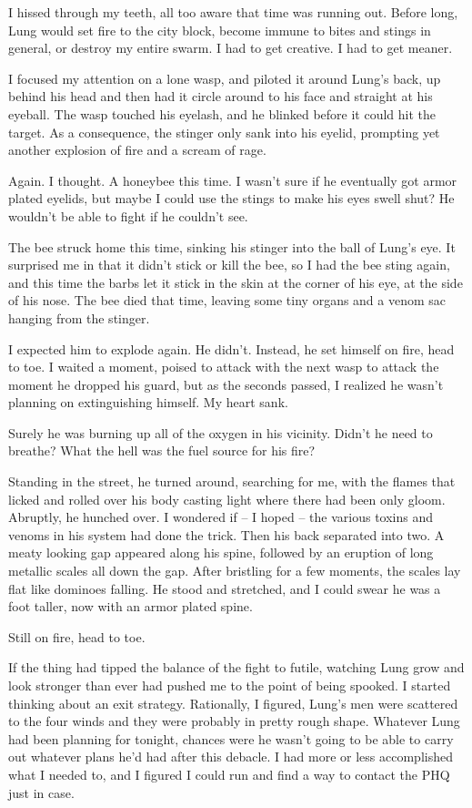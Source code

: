 I hissed through my teeth, all too aware that time was running out. Before long, Lung would set fire to the city block, become immune to bites and stings in general, or destroy my entire swarm. I had to get creative. I had to get meaner.

I focused my attention on a lone wasp, and piloted it around Lung's back, up behind his head and then had it circle around to his face and straight at his eyeball. The wasp touched his eyelash, and he blinked before it could hit the target. As a consequence, the stinger only sank into his eyelid, prompting yet another explosion of fire and a scream of rage.

Again. I thought. A honeybee this time. I wasn't sure if he eventually got armor plated eyelids, but maybe I could use the stings to make his eyes swell shut? He wouldn't be able to fight if he couldn't see.

The bee struck home this time, sinking his stinger into the ball of Lung's eye. It surprised me in that it didn't stick or kill the bee, so I had the bee sting again, and this time the barbs let it stick in the skin at the corner of his eye, at the side of his nose. The bee died that time, leaving some tiny organs and a venom sac hanging from the stinger.

I expected him to explode again. He didn't. Instead, he set himself on fire, head to toe. I waited a moment, poised to attack with the next wasp to attack the moment he dropped his guard, but as the seconds passed, I realized he wasn't planning on extinguishing himself. My heart sank.

Surely he was burning up all of the oxygen in his vicinity. Didn't he need to breathe? What the hell was the fuel source for his fire?

Standing in the street, he turned around, searching for me, with the flames that licked and rolled over his body casting light where there had been only gloom. Abruptly, he hunched over. I wondered if -- I hoped -- the various toxins and venoms in his system had done the trick. Then his back separated into two. A meaty looking gap appeared along his spine, followed by an eruption of long metallic scales all down the gap. After bristling for a few moments, the scales lay flat like dominoes falling. He stood and stretched, and I could swear he was a foot taller, now with an armor plated spine.

Still on fire, head to toe.

If the  thing had tipped the balance of the fight to futile, watching Lung grow and look stronger than ever had pushed me to the point of being spooked. I started thinking about an exit strategy. Rationally, I figured, Lung's men were scattered to the four winds and they were probably in pretty rough shape. Whatever Lung had been planning for tonight, chances were he wasn't going to be able to carry out whatever plans he'd had after this debacle. I had more or less accomplished what I needed to, and I figured I could run and find a way to contact the PHQ just in case.

